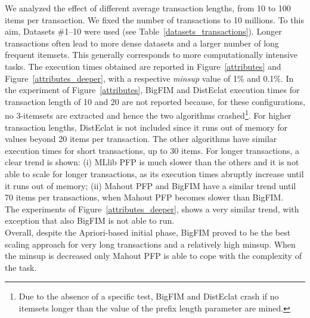 \documentclass[preprint,review,12pt]{elsarticle}
\begin{document}
We analyzed the effect of different average transaction lengths,
from 10 to 100 items per transaction.
We fixed the number of transactions to 10 millions.
To this aim, Datasets \#1--10 were used (see Table~\ref{datasets_transactions}).
Longer transactions often lead to more dense datasets and a larger number of long frequent itemsets.
This generally corresponds to more computationally intensive tasks.
The execution times obtained are reported in Figure~\ref{attributes} and Figure~\ref{attributes_deeper}, with a respective {\it minsup} value of 1\% and 0.1\%.
In the experiment of Figure~\ref{attributes}, BigFIM and DistEclat execution times for transaction length of 10 and 20 are not reported because, for these configurations, no 3-itemsets are extracted and hence the two algorithms crashed\footnote{Due to the absence of a specific test, BigFIM and DistEclat crash
if no itemsets longer than the value of the prefix length parameter are mined.}.
For higher transaction lengths, DistEclat is not included since it runs out of memory
for values beyond 20 items per transaction.
The other algorithms have similar execution times for short transactions,
up to 30 items.
For longer transactions, a clear trend is shown:
(i) MLlib PFP is much slower than the others
and it is not able to scale for longer transactions,
as its execution times abruptly increase until it runs out of memory;
(ii) Mahout PFP and BigFIM have a similar trend until 70 items per transactions,
when Mahout PFP becomes slower than BigFIM.\\
The experiments of Figure~\ref{attributes_deeper}, shows a very similar trend, with exception that also BigFIM is not able to run.\\
Overall, despite the Apriori-based initial phase,
BigFIM proved to be the best scaling approach for very long transactions and a relatively high minsup. When the minsup is decreased only Mahout PFP 
is able to cope with the complexity of the task.\\
\end{document}
